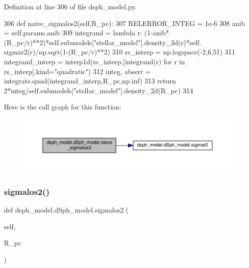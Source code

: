 Definition at line 306 of file dsph\+\_\+model.\+py.


\begin{DoxyCode}
306     \textcolor{keyword}{def }naive\_sigmalos2(self,R\_pc):
307         RELERROR\_INTEG = 1e-6
308         anib = self.params.anib
309         integrand = \textcolor{keyword}{lambda} r: (1-anib*(R\_pc/r)**2)*self.submodels[\textcolor{stringliteral}{"stellar\_model"}].density\_3d(r)*self.
      sigmar2(r)/np.sqrt(1-(R\_pc/r)**2)
310         rs\_interp = np.logspace(-2,6,51)
311         integrand\_interp = interp1d(rs\_interp,[integrand(r) \textcolor{keywordflow}{for} r \textcolor{keywordflow}{in} rs\_interp],kind=\textcolor{stringliteral}{"quadratic"}) 
312         integ, abserr = integrate.quad(integrand\_interp,R\_pc,np.inf)
313         \textcolor{keywordflow}{return} 2*integ/self.submodels[\textcolor{stringliteral}{"stellar\_model"}].density\_2d(R\_pc)
314     
\end{DoxyCode}
Here is the call graph for this function\+:\nopagebreak
\begin{figure}[H]
\begin{center}
\leavevmode
\includegraphics[width=350pt]{d0/d25/classdsph__model_1_1dSph__model_a9db5b642eb5007933136db35b3acf84a_cgraph}
\end{center}
\end{figure}
\mbox{\label{classdsph__model_1_1dSph__model_a7b94850b439fe4afc431cfffa185d415}} 
\subsubsection{\texorpdfstring{sigmalos2()}{sigmalos2()}}
{\footnotesize\ttfamily def dsph\+\_\+model.\+d\+Sph\+\_\+model.\+sigmalos2 (\begin{DoxyParamCaption}\item[{}]{self,  }\item[{}]{R\+\_\+pc }\end{DoxyParamCaption})}



